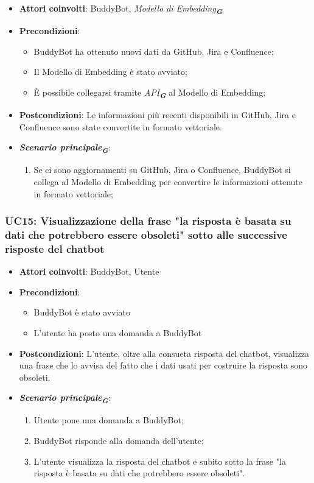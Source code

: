 \begin{itemize}
    \item \textbf{Attori coinvolti}: BuddyBot, \emph{Modello di Embedding}\textsubscript{\textbf{\textit{G}}}
    \item \textbf{Precondizioni}: 
    \begin{itemize}
        \item BuddyBot ha ottenuto nuovi dati da GitHub, Jira e Confluence;
        \item Il Modello di Embedding è stato avviato;
        \item È possibile collegarsi tramite \emph{API}\textsubscript{\textbf{\textit{G}}} al Modello di Embedding;
    \end{itemize}
    \item \textbf{Postcondizioni}: Le informazioni più recenti disponibili in GitHub, Jira e Confluence sono state convertite in formato vettoriale.
    \item \textbf{\emph{Scenario principale}\textsubscript{\textbf{\textit{G}}}}:
    \begin{enumerate}
        \item Se ci sono aggiornamenti su GitHub, Jira o Confluence, BuddyBot si collega al Modello di Embedding per convertire le informazioni 
        ottenute in formato vettoriale;
    \end{enumerate}
\end{itemize}



\subsubsection{UC15: Visualizzazione della frase "la risposta è basata su dati che potrebbero essere obsoleti" sotto alle successive risposte del chatbot}

\begin{itemize}
    \item \textbf{Attori coinvolti}: BuddyBot, Utente
    \item \textbf{Precondizioni}: 
    \begin{itemize}
        \item BuddyBot è stato avviato
        \item L'utente ha posto una domanda a BuddyBot
    \end{itemize}
    \item \textbf{Postcondizioni}: L'utente, oltre alla consueta risposta del chatbot, visualizza una frase che lo avvisa del fatto che i dati usati per 
    costruire la risposta sono obsoleti.
    \item \textbf{\emph{Scenario principale}\textsubscript{\textbf{\textit{G}}}}:
    \begin{enumerate}
        \item Utente pone una domanda a BuddyBot;
        \item BuddyBot risponde alla domanda dell'utente;
        \item L'utente visualizza la risposta del chatbot e subito sotto la frase "la risposta è basata su dati che potrebbero essere obsoleti".
    \end{enumerate}
\end{itemize}
